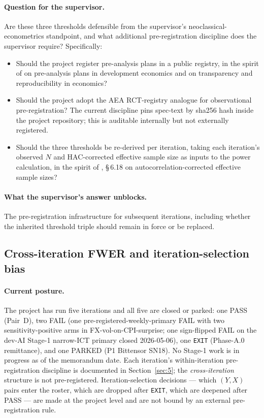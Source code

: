 \paragraph{Question for the supervisor.} Are these three thresholds
defensible from the supervisor's neoclassical-econometrics standpoint,
and what additional pre-registration discipline does the supervisor
require? Specifically:

\begin{itemize}
  \item Should the project register pre-analysis plans in a public
    registry, in the spirit of \citet{olken_2015} on
    pre-analysis plans in development economics and
    \citet{christensen_miguel_2018} on transparency and reproducibility
    in economics?
  \item Should the project adopt the AEA RCT-registry analogue for
    observational pre-registration? The current discipline pins
    spec-text by sha256 hash inside the project repository; this is
    auditable internally but not externally registered.
  \item Should the three thresholds be re-derived per iteration, taking
    each iteration's observed \(N\) and HAC-corrected effective sample
    size as inputs to the power calculation, in the spirit of
    \citet{hansen_2022}, \S\,6.18 on autocorrelation-corrected effective
    sample sizes?
\end{itemize}

\paragraph{What the supervisor's answer unblocks.} The pre-registration
infrastructure for subsequent iterations, including whether the inherited
threshold triple should remain in force or be replaced.

\subsection{Cross-iteration FWER and iteration-selection bias}\label{sec:7.5}

\paragraph{Current posture.} The project has run five iterations and all
five are closed or parked: one PASS (Pair~D), two FAIL (one
pre-registered-weekly-primary FAIL with two sensitivity-positive arms in
FX-vol-on-CPI-surprise; one sign-flipped FAIL on the dev-AI Stage-1
narrow-ICT primary closed 2026-05-06), one \texttt{EXIT}
(Phase-A.0 remittance), and one PARKED (P1 Bittensor SN18). No Stage-1
work is in progress as of the memorandum date. Each iteration's
within-iteration pre-registration discipline is documented in
Section~\ref{sec:5}; the \emph{cross-iteration} structure is not
pre-registered. Iteration-selection decisions --- which \((Y, X)\) pairs
enter the roster, which are dropped after \texttt{EXIT}, which are
deepened after PASS --- are made at the project level and are not bound
by an external pre-registration rule.

